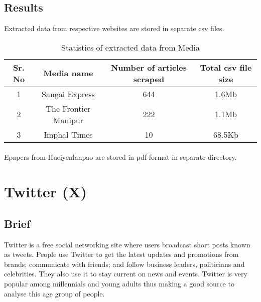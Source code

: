 \documentclass{report}
\begin{document}
\subsection{Results}
Extracted data from respective websites are stored in separate csv files. 
\begin{table}[h]
    \centering
    \setlength{\extrarowheight}{5pt}
    \begin{tabular}{|c|c|c|c|}
        \hline
        Sr. No & Media name & Number of articles scraped & Total csv file size \\
        \hline
        1 & Sangai Express & 644 & 1.6Mb \\
        \hline
        2 & The Frontier Manipur & 222 & 1.1Mb \\
        \hline
        3 & Imphal Times & 10 & 68.5Kb \\
        \hline
    \end{tabular}
    \caption{Statistics of extracted data from Media}
    \label{tab:epaper}
\end{table}
\paragraph{}Epapers from Hueiyenlanpao are stored in pdf format in separate directory.







\newpage
\vspace*{3pt}
\section{Twitter (X)}
\subsection{Brief}
Twitter is a free social networking site where users broadcast short posts known as tweets. People use Twitter to get the latest updates and promotions from brands; communicate with friends; and follow business leaders, politicians and celebrities. They also use it to stay current on news and events. Twitter is very popular among millennials and young adults thus making a good source to analyse this age group of people. 
\end{document}
